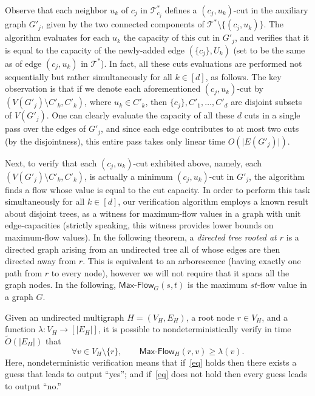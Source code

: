\documentclass{toc}
\theoremstyle{plain}
\newcommand{\ProblemName}[1]{\textsf{#1}}
\newcommand{\MF}{\ProblemName{Max-Flow}\xspace}
\newcommand\tO{\ensuremath{\widetilde O}}  %
\newcommand{\TG}{\mathcal{T}^*}
\providecommand{\set}[1]{{\{#1\}}}
\providecommand{\card}[1]{\lvert#1\rvert}
\begin{document}
Observe that each neighbor $u_k$ of $c_j$ in $\TG_{c_j}$
defines a $(c_j,u_k)$-cut in the auxiliary graph $G'_j$,
given by the two connected components of $\TG\setminus \set{(c_j,u_k)}$.
The algorithm evaluates for each $u_k$ the capacity of this cut in $G'_j$,
and verifies that it is equal to the capacity of the newly-added edge $(\set{c_j}, U_k)$ (set to be the same as of edge $(c_j, u_k)$ in $\TG$).
In fact, all these cuts evaluations are performed not sequentially
but rather simultaneously for all $k\in [d]$, as follows.
The key observation is that if we denote
each aforementioned $(c_j,u_k)$-cut by $(V(G'_j)\setminus C'_k, C'_k)$,
where $u_k\in C'_k$,
then $\set{c_j},C'_1,\ldots,C'_d$ are disjoint subsets of $V(G'_j)$.
One can clearly evaluate the capacity of all these $d$ cuts
in a single pass over the edges of $G'_j$,
and since each edge contributes to at most two cuts (by the disjointness),
this entire pass takes only linear time $O(\card{E(G'_j)})$.

Next, to verify that each $(c_j,u_k)$-cut exhibited above,
namely, each $(V(G'_j)\setminus C'_k, C'_k)$,
is actually a minimum $(c_j,u_k)$-cut in $G'_j$,
the algorithm finds a flow whose value is equal to the cut capacity.
In order to perform this task simultaneously for all $k\in[d]$,
our verification algorithm employs a known result about disjoint trees,
as a witness for maximum-flow values in a graph with unit edge-capacities
(strictly speaking, this witness provides lower bounds on maximum-flow values).
In the following theorem, a \emph{directed tree rooted at $r$}
is a directed graph arising from an undirected tree
all of whose edges are then directed away from $r$.
This is equivalent to an arborescence
(having exactly one path from $r$ to every
%
%
node),   %
however we will not require that it spans all the graph nodes. In the following, $\MF_{G}(s,t)$ is the maximum $st$-flow value in a graph $G$.


\begin{lemma}\label{lemma:packing}
Given an undirected multigraph $H=(V_H,E_H)$, a root node $r\in V_H$, and a function $\lambda:V_H\rightarrow [\card{E_H}]$, it is possible to nondeterministically verify in time $\tO(\card{E_H})$ that
\begin{equation}\label{eq}
  \forall v\in V_H\setminus\set{r},
  \qquad
  \MF_{H}(r,v)\geq \lambda(v).
\end{equation}
Here, nondeterministic verification means that
if~\eqref{eq} holds then there exists a guess that leads to output ``yes'';
and if~\eqref{eq} does not hold then every guess leads to output ``no.''
\end{lemma}
\end{document}
